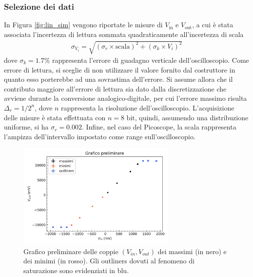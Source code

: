 \documentclass[a4paper,11pt]{article}
\begin{document}
\subsubsection{Selezione dei dati}
In Figura \ref{fig:lin_sim} vengono riportate le misure di $V_{\text{in}}$ e $V_{\text{out}}$, a cui è stata
associata l'incertezza di lettura sommata quadraticamente all'incertezza di scala
\begin{align}\label{e:err_misure}
  \sigma_{V_{i}}= \sqrt{ \left(\sigma_{r} \times \text{scala} \right)^{2} +
  \left( \sigma_{k} \times V_{i} \right)^{2}}
\end{align}
dove $\sigma_{k} = 1.7\%$ rappresenta l'errore di guadagno verticale dell'oscilloscopio. Come errore di lettura, si sceglie
di non utilizzare il valore fornito dal costruttore in quanto esso porterebbe ad
una sovrastima dell'errore. Si assume allora che il contributo maggiore all'errore di
lettura sia dato dalla discretizzazione che avviene durante la conversione analogico-digitale, per
cui l'errore massimo risulta $\Delta_{r}= 1 / 2^{n}$, dove $n$ rappresenta la risoluzione
dell'oscilloscopio. L'acquisizione delle misure è stata effettuata con $n=8 \text{ bit}$,
quindi, assumendo una distribuzione uniforme, si ha $\sigma_{r} = 0.002$.
Infine, nel caso del Picoscope, la scala rappresenta l'ampizza dell'intervallo impostato come range
sull'oscilloscopio.
\begin{figure}[h]
\centering
\includegraphics[width=0.7\textwidth]{images/grafico_esplorativo}
\caption{\footnotesize Grafico preliminare delle coppie $(V_{in},V_{out})$ dei massimi (in nero) e dei minimi (in rosso). Gli outliners dovuti al fenomeno di saturazione sono
evidenziati in blu.}\label{fig:lin_prelim}
\end{figure}
\end{document}
